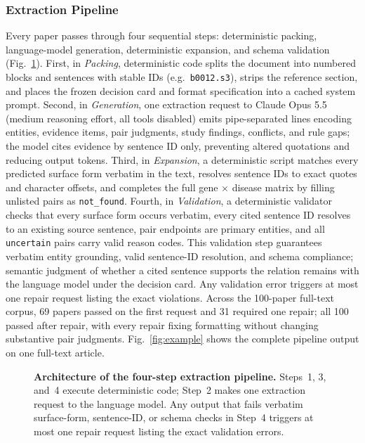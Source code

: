 \documentclass[preprint,10pt,letterpaper]{elsarticle}
\newcommand{\st}[1]{\texttt{#1}}             %
\begin{document}
\subsubsection{Extraction Pipeline}
Every paper passes through four sequential steps: deterministic packing, language-model generation, deterministic expansion, and schema validation (Fig.~\ref{fig:pipeline}). First, in \emph{Packing}, deterministic code splits the document into numbered blocks and sentences with stable IDs (e.g.\ \texttt{b0012.s3}), strips the reference section, and places the frozen decision card and format specification into a cached system prompt. Second, in \emph{Generation}, one extraction request to Claude Opus 5.5 (medium reasoning effort, all tools disabled) emits pipe-separated lines encoding entities, evidence items, pair judgments, study findings, conflicts, and rule gaps; the model cites evidence by sentence ID only, preventing altered quotations and reducing output tokens. Third, in \emph{Expansion}, a deterministic script matches every predicted surface form verbatim in the text, resolves sentence IDs to exact quotes and character offsets, and completes the full gene $\times$ disease matrix by filling unlisted pairs as \st{not\_found}. Fourth, in \emph{Validation}, a deterministic validator checks that every surface form occurs verbatim, every cited sentence ID resolves to an existing source sentence, pair endpoints are primary entities, and all \st{uncertain} pairs carry valid reason codes. This validation step guarantees verbatim entity grounding, valid sentence-ID resolution, and schema compliance; semantic judgment of whether a cited sentence supports the relation remains with the language model under the decision card. Any validation error triggers at most one repair request listing the exact violations. Across the 100-paper full-text corpus, 69 papers passed on the first request and 31 required one repair; all 100 passed after repair, with every repair fixing formatting without changing substantive pair judgments. Fig.~\ref{fig:example} shows the complete pipeline output on one full-text article.

\begin{figure}[!htbp]
\centering
\resizebox{\linewidth}{!}{}
\caption{\textbf{Architecture of the four-step extraction pipeline.} Steps~1, 3, and~4 execute deterministic code; Step~2 makes one extraction request to the language model. Any output that fails verbatim surface-form, sentence-ID, or schema checks in Step~4 triggers at most one repair request listing the exact validation errors.}
\label{fig:pipeline}
\end{figure}
\end{document}
